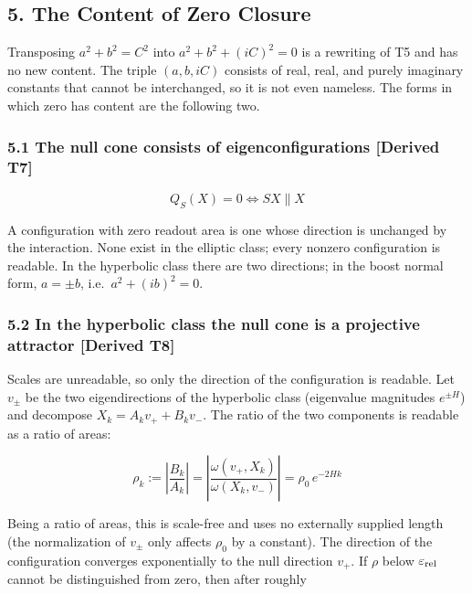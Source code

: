 \documentclass[
  a4paper,
]{article}
\begin{document}
\subsection{5. The Content of Zero
Closure}\label{the-content-of-zero-closure}

Transposing \(a^2+b^2=C^2\) into \(a^2+b^2+(iC)^2=0\) is a rewriting of
T5 and has no new content. The triple \((a,b,iC)\) consists of real,
real, and purely imaginary constants that cannot be interchanged, so it
is not even nameless. The forms in which zero has content are the
following two.

\subsubsection{5.1 The null cone consists of eigenconfigurations
{[}Derived
T7{]}}\label{the-null-cone-consists-of-eigenconfigurations-derived-t7}

\[
Q_S(X)=0\iff SX\parallel X
\]

A configuration with zero readout area is one whose direction is
unchanged by the interaction. None exist in the elliptic class; every
nonzero configuration is readable. In the hyperbolic class there are two
directions; in the boost normal form, \(a=\pm b\),
i.e.~\(a^2+(ib)^2=0\).

\subsubsection{5.2 In the hyperbolic class the null cone is a projective
attractor {[}Derived
T8{]}}\label{in-the-hyperbolic-class-the-null-cone-is-a-projective-attractor-derived-t8}

Scales are unreadable, so only the direction of the configuration is
readable. Let \(v_\pm\) be the two eigendirections of the hyperbolic
class (eigenvalue magnitudes \(e^{\pm H}\)) and decompose
\(X_k=A_kv_++B_kv_-\). The ratio of the two components is readable as a
ratio of areas:

\[
\rho_k:=\left\lvert\frac{B_k}{A_k}\right\rvert=\left\lvert\frac{\omega(v_+,X_k)}{\omega(X_k,v_-)}\right\rvert=\rho_0\,e^{-2Hk}
\]

Being a ratio of areas, this is scale-free and uses no externally
supplied length (the normalization of \(v_\pm\) only affects \(\rho_0\)
by a constant). The direction of the configuration converges
exponentially to the null direction \(v_+\). If \(\rho\) below
\(\varepsilon_{\rm rel}\) cannot be distinguished from zero, then after
roughly
\end{document}
